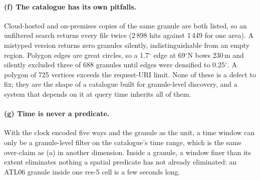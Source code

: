 \documentclass[10pt,a4paper]{article}
\begin{document}
\paragraph{(f) The catalogue has its own pitfalls.} Cloud-hosted and on-premises copies of the same granule are both
listed, so an unfiltered search returns every file twice (2\,898 hits against 1\,449 for one area). A mistyped
version returns zero granules silently, indistinguishable from an empty region. Polygon edges are great circles, so
a 1.7$^\circ$ edge at 69$^\circ$N bows 230\,m and silently excluded three of 688 granules until edges were
densified to 0.25$^\circ$. A polygon of 725 vertices exceeds the request-URI limit. None of these is a defect to fix;
they are the shape of a catalogue built for granule-level discovery, and a system that depends on it at query time
inherits all of them.

\paragraph{(g) Time is never a predicate.} With the clock encoded five ways and the granule as the unit, a time
window can only be a granule-level filter on the catalogue's time range, which is the same over-claim as (a) in
another dimension. Inside a granule, a window finer than its extent eliminates nothing a spatial predicate has not
already eliminated: an ATL06 granule inside one res-5 cell is a few seconds long.
\end{document}

